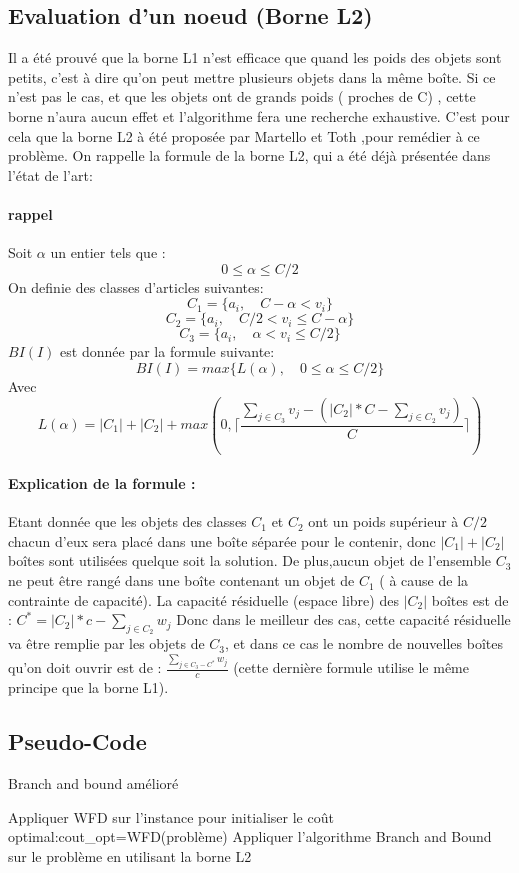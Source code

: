 \documentclass[12pt]{article}
\begin{document}
\subsection{Evaluation d'un noeud (Borne L2)}
Il a été prouvé que la borne L1 n’est efficace que quand les poids des objets sont petits, c’est à dire qu’on peut mettre plusieurs objets dans la même boîte. Si ce n’est pas le cas, et que les objets ont de grands poids ( proches de C) , cette borne n’aura aucun effet et l’algorithme fera une recherche exhaustive. 
C’est pour cela que la borne L2 à été proposée par Martello et Toth ,pour remédier à ce problème. 
On rappelle la formule de la borne L2, qui a été déjà présentée dans l’état de l’art:
\paragraph{rappel}
Soit \(\alpha\) un entier tels que :
\[0 \le \alpha \le C/2\]
On definie des classes d'articles suivantes: 
\[C_1 = \{a_i, \quad C-\alpha < v_i\} \]
\[C_2 = \{a_i, \quad C/2 < v_i \le C-\alpha\} \]
\[C_3 = \{a_i, \quad \alpha < v_i \le C/2\} \]
\(BI(I)\)  est donnée par la formule suivante:
\[BI(I)=max\{L(\alpha),\quad 0 \le \alpha \le C/2\}\]
Avec
\[L(\alpha)=|C_1|+|C_2|+max(0, \lceil{\frac{\sum_{j \in C_3}^{} v_j - (|C_2|*C - \sum_{j \in C_2}^{} v_j) }{C}}\rceil)\]
\paragraph{Explication de la formule :}
Etant donnée que les objets des classes $C_1$ et $C_2$ ont un poids supérieur à $C/2$ chacun d'eux sera placé dans une boîte séparée pour le contenir, donc
$|C_1|+|C_2|$boîtes sont utilisées quelque soit la solution. De plus,aucun objet de l’ensemble $C_3$ ne peut être rangé dans une boîte contenant un objet de $C_1$ ( à cause de la contrainte de capacité). La capacité résiduelle (espace libre) des
$|C_2|$ boîtes est de : $C^*=|C_2|*c-\sum_{j \in C_2}^{} w_j$
Donc dans le meilleur des cas, cette capacité résiduelle va être remplie par les objets de $C_3$, et dans ce cas le nombre de nouvelles boîtes qu’on doit ouvrir est de :  
$\frac{\sum_{j \in C_3 -C^*}^{} w_j}{c}$ (cette dernière formule utilise le même principe que la borne L1).
\subsection{Pseudo-Code}
\begin{algorithm}[H]
   \caption{Branch and bound amélioré }
   \begin{algorithmic} 
   \STATE Appliquer WFD sur l’instance pour initialiser le coût optimal:\linebreak cout\_opt=WFD(problème)
   \STATE Appliquer l’algorithme Branch and Bound sur le problème en utilisant la borne L2
   \end{algorithmic} 
\end{algorithm}
\end{document}
